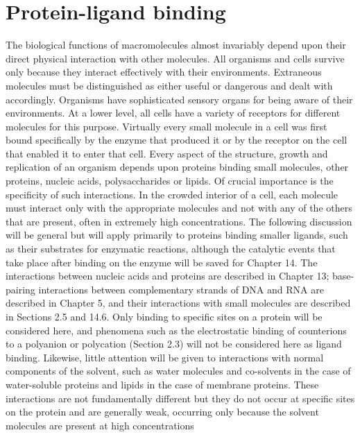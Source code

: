 \section{Protein-ligand binding}
The biological functions of macromolecules almost invariably depend upon their direct physical
interaction with other molecules. All organisms and cells survive only because they interact
effectively with their environments. Extraneous molecules must be distinguished as either useful or
dangerous and dealt with accordingly. Organisms have sophisticated sensory organs for being aware
of their environments. At a lower level, all cells have a variety of receptors for different molecules
for this purpose. Virtually every small molecule in a cell was first bound specifically by the enzyme
that produced it or by the receptor on the cell that enabled it to enter that cell. Every aspect of the
structure, growth and replication of an organism depends upon proteins binding small molecules,
other proteins, nucleic acids, polysaccharides or lipids. Of crucial importance is the specificity of such
interactions. In the crowded interior of a cell, each molecule must interact only with the appropriate
molecules and not with any of the others that are present, often in extremely high concentrations.
The following discussion will be general but will apply primarily to proteins binding smaller ligands,
such as their substrates for enzymatic reactions, although the catalytic events that take place after
binding on the enzyme will be saved for Chapter 14. The interactions between nucleic acids and
proteins are described in Chapter 13; base-pairing interactions between complementary strands of
DNA and RNA are described in Chapter 5, and their interactions with small molecules are described
in Sections 2.5 and 14.6.
Only binding to specific sites on a protein will be considered here, and phenomena such as the
electrostatic binding of counterions to a polyanion or polycation (Section 2.3) will not be considered
here as ligand binding. Likewise, little attention will be given to interactions with normal components
of the solvent, such as water molecules and co-solvents in the case of water-soluble proteins and lipids
in the case of membrane proteins. These interactions are not fundamentally different but they do
not occur at specific sites on the protein and are generally weak, occurring only because the solvent
molecules are present at high concentrations


